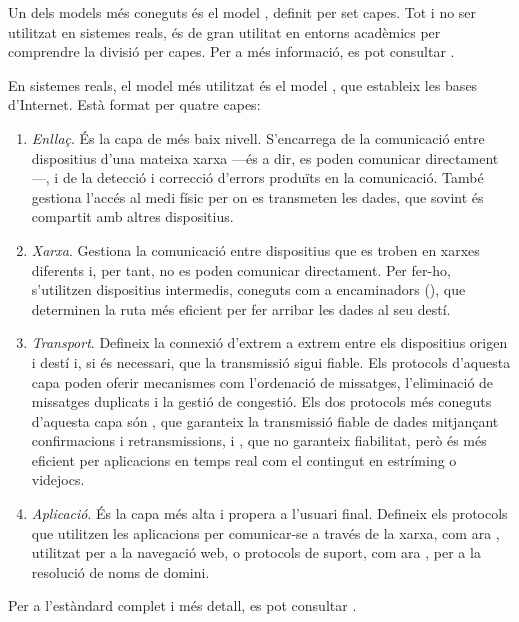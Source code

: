\documentclass{tfgitic}[2024/07/01]
\begin{document}
Un dels models més coneguts és el model , definit per set capes. Tot i no ser utilitzat en sistemes reals, és de gran utilitat en entorns acadèmics per comprendre la divisió per capes. Per a més informació, es pot consultar \cite{noauthor_isoiec_1994}.

En sistemes reals, el model més utilitzat és el model , que estableix les bases d'Internet. Està format per quatre capes:
\begin{enumerate}
    \item \emph{Enllaç}. És la capa de més baix nivell. S'encarrega de la comunicació entre dispositius d'una mateixa xarxa ---és a dir, es poden comunicar directament---, i de la detecció i correcció d'errors produïts en la comunicació. També gestiona l'accés al medi físic per on es transmeten les dades, que sovint és compartit amb altres dispositius.
    \item \emph{Xarxa}. Gestiona la comunicació entre dispositius que es troben en xarxes diferents i, per tant, no es poden comunicar directament. Per fer-ho, s'utilitzen dispositius intermedis, coneguts com a encaminadors (), que determinen la ruta més eficient per fer arribar les dades al seu destí.
    \item \emph{Transport}. Defineix la connexió d'extrem a extrem entre els dispositius origen i destí i, si és necessari, que la transmissió sigui fiable. Els protocols d'aquesta capa poden oferir mecanismes com l'ordenació de missatges, l'eliminació de missatges duplicats i la gestió de congestió. Els dos protocols més coneguts d'aquesta capa són , que garanteix la transmissió fiable de dades mitjançant confirmacions i retransmissions, i , que no garanteix fiabilitat, però és més eficient per aplicacions en temps real com el contingut en estríming o videjocs.
    \item \emph{Aplicació}. És la capa més alta i propera a l'usuari final. Defineix els protocols que utilitzen les aplicacions per comunicar-se a través de la xarxa, com ara , utilitzat per a la navegació web, o protocols de suport, com ara , per a la resolució de noms de domini.
\end{enumerate}
Per a l'estàndard complet i més detall, es pot consultar \cite{braden_requirements_1989}. 

\end{document}
